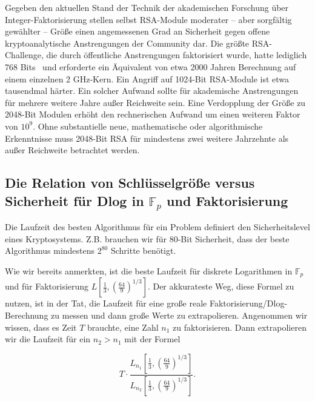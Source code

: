 \begin{refsegment}
Gegeben den aktuellen Stand der Technik der akademischen Forschung über Integer-Faktori\-sierung
stellen selbst RSA-Module moderater -- aber sorgfältig gewählter -- Größe einen angemessenen Grad an Sicherheit gegen offene kryptoanalytische Anstrengungen der Community dar. Die größte RSA-Challenge, die durch öffentliche Anstrengungen faktorisiert wurde, hatte lediglich 768 Bits~\cite{factor768_2010} und erforderte ein Äquivalent von etwa 2000 Jahren Berechnung auf einem einzelnen 2 GHz-Kern. Ein Angriff auf 1024-Bit RSA-Module ist etwa tausendmal härter. Ein solcher Aufwand sollte für akademische Anstrengungen für mehrere weitere Jahre außer Reichweite sein. Eine Verdopplung der Größe zu 2048-Bit Modulen erhöht den rechnerischen Aufwand um einen weiteren Faktor von $10^9$. Ohne substantielle neue, mathematische oder algorithmische Erkenntnisse muss 2048-Bit RSA für mindestens zwei weitere Jahrzehnte als außer Reichweite betrachtet werden.


\subsection{\texorpdfstring{Die Relation von Schlüsselgröße versus Sicherheit für Dlog in $\mathbb{F}_p$ und Faktorisierung}{Die Relation von Schlüsselgröße versus Sicherheit für Dlog in Fp und Faktorisierung}}
\label{key-size-factoring}

Die Laufzeit des besten Algorithmus für ein Problem definiert den Sicherheitslevel eines Kryptosystems. Z.B. brauchen wir für 80-Bit Sicherheit, dass der beste Algorithmus
mindestens $2^{80}$ Schritte benötigt.

Wie wir bereits anmerkten, ist die beste Laufzeit für diskrete Logarithmen in $\mathbb{F}_p$ und für Faktorisierung $L[\frac 1 3,\left(\frac{64}{9}\right)^{1/3}]$. Der akkurateste Weg, diese Formel zu nutzen, ist in der Tat, die Laufzeit für eine große reale Faktorisierung/Dlog-Berechnung zu messen und dann große Werte zu extrapolieren. Angenommen wir wissen, dass es Zeit $T$ brauchte, eine Zahl $n_1$ zu faktorisieren. Dann extrapolieren wir die Laufzeit für ein $n_2 > n_1$ mit der Formel

$$
  T  \cdot \frac{ L_{n_1}[\frac 1
3,\left(\frac{64}{9}\right)^{1/3}] }
{ L_{n_2}[\frac 1
3,\left(\frac{64}{9}\right)^{1/3}] }.
$$


\end{refsegment}
